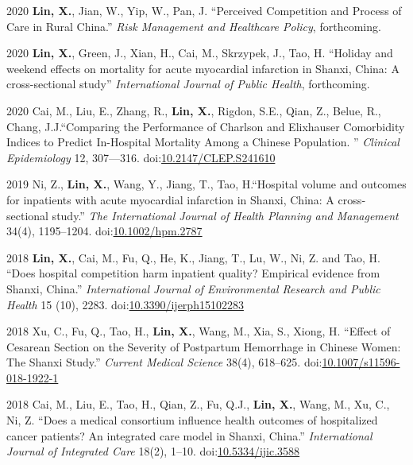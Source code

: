 \documentclass[12pt,letterpaper]{report}
\begin{document}
    \begin{tablist}
                
        \item[2020] \tab \textbf{Lin, X.}, Jian, W., Yip, W., Pan, J. \enquote{Perceived Competition and Process of Care in Rural China.} \textit{Risk Management and Healthcare Policy}, forthcoming. 
    
         \item[2020] \tab \textbf{Lin, X.}, Green, J., Xian, H., Cai, M., Skrzypek, J., Tao, H. \enquote{Holiday and weekend effects on mortality for acute myocardial infarction in Shanxi, China:  A cross-sectional study} \textit{International Journal of Public Health}, forthcoming.
    	
    	\item[2020] \tab Cai, M., Liu, E., Zhang, R., \textbf{Lin, X.},  Rigdon, S.E., Qian, Z., Belue, R., Chang, J.J.\enquote{Comparing the Performance of Charlson and Elixhauser Comorbidity Indices to Predict In-Hospital Mortality Among a Chinese Population. } \textit{Clinical Epidemiology} 12, 307—316. doi:\href{https://doi.org/10.2147/CLEP.S241610}{10.2147/CLEP.S241610}
    	
    	\item[2019] \tab Ni, Z.,  \textbf{Lin, X.}, Wang, Y., Jiang, T., Tao, H.\enquote{Hospital volume and outcomes for inpatients with acute myocardial infarction in Shanxi, China: A cross‐sectional study.} \textit{The International Journal of Health Planning and Management} 34(4), 1195–1204. doi:\href{https://doi.org/10.1002/hpm.2787}{10.1002/hpm.2787}
    	
    	\item[2018] \tab \textbf{Lin, X.}, Cai, M., Fu, Q., He, K., Jiang, T., Lu, W., Ni, Z. and Tao, H. \enquote{Does hospital competition harm inpatient quality? Empirical evidence from Shanxi, China.} \textit{International Journal of Environmental Research and Public Health} 15 (10), 2283. doi:\href{https://doi.org/10.3390/ijerph15102283}{10.3390/ijerph15102283}
    	
    	\item[2018] \tab Xu, C., Fu, Q., Tao, H., \textbf{Lin, X.}, Wang, M., Xia, S., Xiong, H. \enquote{Effect of Cesarean Section on the Severity of Postpartum Hemorrhage in Chinese Women: The Shanxi Study.} \textit{Current Medical Science} 38(4), 618–625. doi:\href{https://doi.org/10.1007/s11596-018-1922-1}{10.1007/s11596-018-1922-1}
    	
    	 \item[2018] \tab Cai, M., Liu, E., Tao, H., Qian, Z., Fu, Q.J., \textbf{Lin, X.}, Wang, M., Xu, C., Ni, Z. \enquote{Does a medical consortium influence health outcomes of hospitalized cancer patients? An integrated care model in Shanxi, China.} \textit{International Journal of Integrated Care}  18(2), 1–10. doi:\href{https://doi.org/10.5334/ijic.3588}{10.5334/ijic.3588}
    	 

\end{tablist}
\end{document}
